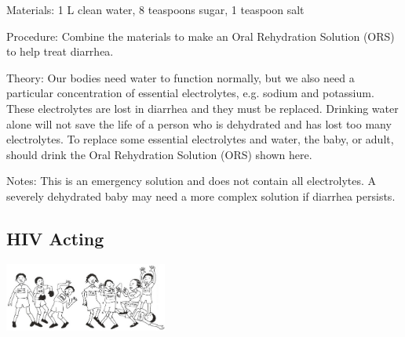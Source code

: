 \begin{multicols}{2}
\begin{description*}
\item[Materials:]{1 L clean water, 8 teaspoons sugar, 1 teaspoon salt}
\item[Procedure:]{Combine the materials to make an Oral Rehydration Solution (ORS) to help treat diarrhea.}
\item[Theory:]{Our bodies need water to function normally,
but we also need a particular concentration of essential electrolytes,
e.g. sodium and potassium. These electrolytes are lost in diarrhea and
they must be replaced. Drinking water alone will not save the life of a
person who is dehydrated and has lost too many electrolytes. To
replace some essential electrolytes and water, the baby, or adult,
should drink the Oral Rehydration Solution (ORS)
shown here.}
\item[Notes:]{This is an emergency solution and does not contain
all electrolytes. A severely dehydrated baby may need a
more complex solution if diarrhea persists.}
\end{description*}

\vfill
\columnbreak

\subsection{HIV Acting} %

\begin{center}
\includegraphics[width=0.4\textwidth]{./img/vso/hiv-acting.jpg}
\end{center}


\end{multicols}
